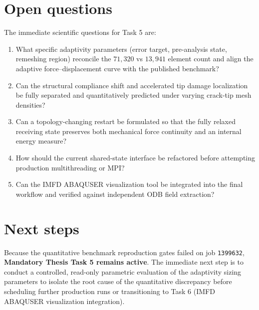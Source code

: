 \section{Open questions}
The immediate scientific questions for Task 5 are:
\begin{enumerate}
  \item What specific adaptivity parameters (error target, pre-analysis state, remeshing region) reconcile the $71{,}320$ vs $13{,}941$ element count and align the adaptive force--displacement curve with the published benchmark?
  \item Can the structural compliance shift and accelerated tip damage localization be fully separated and quantitatively predicted under varying crack-tip mesh densities?
  \item Can a topology-changing restart be formulated so that the fully relaxed receiving state preserves both mechanical force continuity and an internal energy measure?
  \item How should the current shared-state interface be refactored before attempting production multithreading or MPI?
  \item Can the IMFD ABAQUSER visualization tool be integrated into the final workflow and verified against independent ODB field extraction?
\end{enumerate}

\section{Next steps}
Because the quantitative benchmark reproduction gates failed on job \texttt{1399632}, \textbf{Mandatory Thesis Task 5 remains active}. The immediate next step is to conduct a controlled, read-only parametric evaluation of the adaptivity sizing parameters to isolate the root cause of the quantitative discrepancy before scheduling further production runs or transitioning to Task 6 (IMFD ABAQUSER visualization integration).
